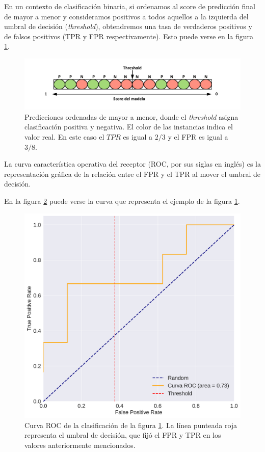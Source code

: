 \begin{itemize}
    En un contexto de clasificación binaria, si ordenamos al score de predicción final de mayor a menor y consideramos positivos a todos aquellos a la izquierda del umbral de decisión (\textit{threshold}), obtendremos una tasa de verdaderos positivos y de falsos positivos (TPR y FPR respectivamente). Esto puede verse en la figura \ref{fig:threshold_auc}.
    
    \begin{figure}[H]
    \centering
        \includegraphics[scale=0.8]{documents/latex/figures/1/threshold_auc.pdf}
    \caption{Predicciones ordenadas de mayor a menor, donde el \textit{threshold} asigna clasificación positiva y negativa. El color de las instancias indica el valor real. En este caso el $TPR$ es igual a $2/3$ y el FPR es igual a $3/8$.}
    \label{fig:threshold_auc}
    \end{figure}
    
    La curva característica operativa del receptor (ROC, por sus siglas en inglés) es la representación gráfica de la relación entre el FPR y el TPR al mover el umbral de decisión. 

    En la figura \ref{fig:example_roc} puede verse la curva que representa el ejemplo de la figura \ref{fig:threshold_auc}.
    
    \begin{figure}[H]
        \centering
        \includegraphics[scale=0.35]{documents/latex/figures/1/roc_ejemplo.pdf}
        \caption{Curva ROC de la clasificación de la figura \ref{fig:threshold_auc}. La línea punteada roja representa el umbral de decisión, que fijó el FPR y TPR en los valores anteriormente mencionados.}
        \label{fig:example_roc}
    \end{figure}
    

\end{itemize}
